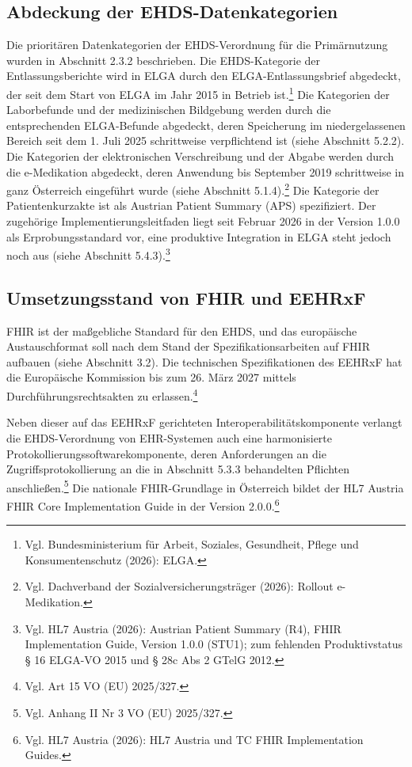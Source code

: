     \subsection{Abdeckung der EHDS-Datenkategorien}
Die prioritären Datenkategorien der EHDS-Verordnung für die Primärnutzung wurden in Abschnitt 2.3.2 beschrieben. Die EHDS-Kategorie der Entlassungsberichte wird in ELGA durch den ELGA-Entlassungsbrief abgedeckt, der seit dem Start von ELGA im Jahr 2015 in Betrieb ist.\footnote{Vgl. Bundesministerium für Arbeit, Soziales, Gesundheit, Pflege und Konsumentenschutz (2026): ELGA.} Die Kategorien der Laborbefunde und der medizinischen Bildgebung werden durch die entsprechenden ELGA-Befunde abgedeckt, deren Speicherung im niedergelassenen Bereich seit dem 1. Juli 2025 schrittweise verpflichtend ist (siehe Abschnitt 5.2.2). Die Kategorien der elektronischen Verschreibung und der Abgabe werden durch die e-Medikation abgedeckt, deren Anwendung bis September 2019 schrittweise in ganz Österreich eingeführt wurde (siehe Abschnitt 5.1.4).\footnote{Vgl. Dachverband der Sozialversicherungsträger (2026): Rollout e-Medikation.} Die Kategorie der Patientenkurzakte ist als Austrian Patient Summary (APS)
spezifiziert. Der zugehörige Implementierungsleitfaden liegt seit Februar 2026
in der Version 1.0.0 als Erprobungsstandard vor,
eine produktive Integration in ELGA steht jedoch noch aus (siehe
Abschnitt 5.4.3).\footnote{Vgl. HL7 Austria (2026): Austrian Patient Summary
(R4), FHIR Implementation Guide, Version 1.0.0 (STU1); zum fehlenden
Produktivstatus § 16 ELGA-VO 2015 und § 28c Abs 2 GTelG 2012.}



    \subsection{Umsetzungsstand von FHIR und EEHRxF}
FHIR ist der maßgebliche Standard für den EHDS, und das europäische Austauschformat soll nach dem Stand der Spezifikationsarbeiten auf FHIR aufbauen (siehe Abschnitt 3.2). Die technischen Spezifikationen des EEHRxF hat die Europäische Kommission bis zum 26. März 2027 mittels Durchführungsrechtsakten zu erlassen.\footnote{Vgl. Art 15 VO (EU) 2025/327.}

Neben dieser auf das EEHRxF gerichteten Interoperabilitätskomponente verlangt die EHDS-Verordnung von EHR-Systemen auch eine harmonisierte Protokollierungssoftwarekomponente, deren Anforderungen an die Zugriffsprotokollierung an die in Abschnitt 5.3.3 behandelten Pflichten anschließen.\footnote{Vgl. Anhang II Nr 3 VO (EU) 2025/327.} Die nationale FHIR-Grundlage in Österreich bildet der HL7 Austria FHIR Core Implementation Guide in der Version 2.0.0.\footnote{Vgl. HL7 Austria (2026): HL7 Austria und TC FHIR Implementation Guides.}



